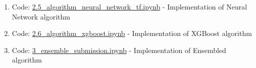 \documentclass[sigconf]{acmart}
\begin{document}
\begin{enumerate}
    	\item Code: \href{https://github.com/bigdata-i523/hid306/blob/master/project/code/2.5_algorithm_neural_network_tf.ipynb}{2.5\_algorithm\_neural\_network\_tf.ipynb} - Implementation of Neural Network algorithm
    	
    	\item Code: \href{https://github.com/bigdata-i523/hid306/blob/master/project/code/2.6_algorithm_xgboost.ipynb}{2.6\_algorithm\_xgboost.ipynb} - Implementation of XGBoost algorithm
    	
    	\item Code: \href{https://github.com/bigdata-i523/hid306/blob/master/project/code/3_ensemble_kaggle_submission.ipynb}{3\_ensemble\_submission.ipynb} - Implementation of Ensembled algorithm
    \end{enumerate}    
    
\end{document}
